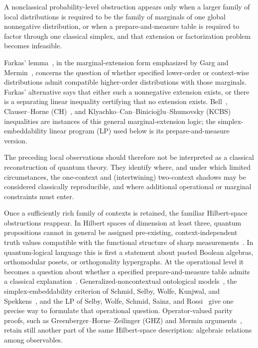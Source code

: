 \documentclass[aps,pra,twocolumn,superscriptaddress,nofootinbib]{revtex4-2}
\begin{document}
A nonclassical probability-level obstruction appears only when a larger family
of local distributions is required to be the family of marginals of one global
nonnegative distribution, or when a prepare-and-measure table is required to
factor through one classical simplex, and that extension or factorization
problem becomes infeasible.

Farkas' lemma~\cite{Farkas1902,Schrijver}, in the marginal-extension form
emphasized by Garg and Mermin~\cite{Garg1984}, concerns the question of
whether specified lower-order or context-wise distributions admit compatible
higher-order distributions with those marginals.  Farkas' alternative says
that either such a nonnegative extension exists, or there is a separating
linear inequality certifying that no extension exists.  Bell~\cite{bell},
Clauser--Horne (CH)~\cite{cl-horne}, and
Klyachko--Can--Binicio\u{g}lu--Shumovsky (KCBS)~\cite{Klyachko-2008}
inequalities are instances of this general marginal-extension logic; the
simplex-embeddability linear program (LP) used below is its prepare-and-measure
version.

The preceding local observations should therefore not be interpreted as a
classical reconstruction of quantum theory.  They identify where, and under
which limited circumstances, the one-context and (intertwining) two-context shadows may
be considered classically reproducible, and where additional operational or
marginal constraints must enter.

Once a sufficiently rich family of contexts
is retained, the familiar Hilbert-space obstructions reappear.  In Hilbert
spaces of dimension at least three, quantum
propositions cannot in general be assigned pre-existing, context-independent
truth values compatible with the functional structure of sharp
measurements~\cite{Gleason,specker-60,kamber65,ZirlSchl-65,Zierler1975,
kochen1,cabello-96,Pavi_i__2019,cabello2021contextuality}.  In quantum-logical
language this is first a statement about pasted Boolean algebras, orthomodular
posets, or orthogonality hypergraphs.  At the operational level it becomes a
question about whether a specified prepare-and-measure table admits a classical
explanation~\cite{froissart-81,Garg1984,pitowsky-86,svozil-2001-cesena,
Klyachko-2008,Yu-2012,peres222}.
Generalized-noncontextual ontological models~\cite{Spekkens-04}, the
simplex-embeddability criterion of Schmid, Selby, Wolfe, Kunjwal, and
Spekkens~\cite{schmid-2021-simplex}, and the LP of Selby, Wolfe,
Schmid, Sainz, and Rossi~\cite{selby-2024-lp} give one precise way to formulate
that operational question.  Operator-valued parity proofs, such as
Greenberger--Horne--Zeilinger (GHZ) and Mermin arguments~\cite{ghz,mermin90b,
svozil-2024-convert-pra-externalfigures}, retain still another part of the same
Hilbert-space description: algebraic relations among observables.
\end{document}

